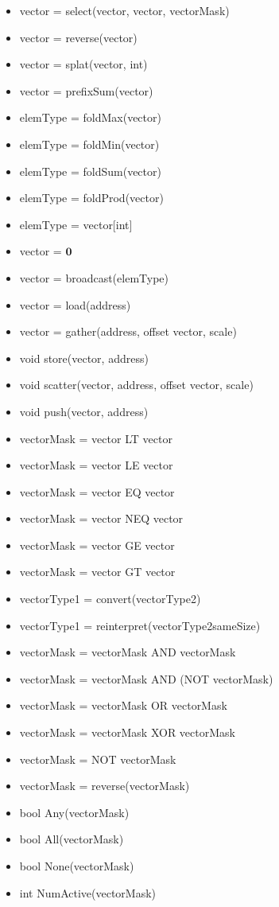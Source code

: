 \documentclass[11pt]{amsart}
\begin{document}
\begin{itemize}
\item vector = select(vector, vector, vectorMask)
\item vector = reverse(vector)
\item vector = splat(vector, int)
\item vector = prefixSum(vector)
\item elemType = foldMax(vector)
\item elemType = foldMin(vector)
\item elemType = foldSum(vector)
\item elemType = foldProd(vector)
\item elemType = vector[int]
\item vector = $\mathbf{0}$
\item vector = broadcast(elemType)
\item vector = load(address)
\item vector = gather(address, offset vector, scale)
\item void store(vector, address)
\item void scatter(vector, address, offset vector, scale)
\item void push(vector, address)
\item vectorMask = vector LT vector
\item vectorMask = vector LE vector
\item vectorMask = vector EQ vector
\item vectorMask = vector NEQ vector
\item vectorMask = vector GE vector
\item vectorMask = vector GT vector
\item vectorType1 = convert(vectorType2)
\item vectorType1 = reinterpret(vectorType2sameSize)
\item vectorMask = vectorMask AND vectorMask
\item vectorMask = vectorMask AND (NOT vectorMask)
\item vectorMask = vectorMask OR vectorMask
\item vectorMask = vectorMask XOR vectorMask
\item vectorMask = NOT vectorMask
\item vectorMask = reverse(vectorMask)
\item bool Any(vectorMask)
\item bool All(vectorMask)
\item bool None(vectorMask)

\item int NumActive(vectorMask)
\end{itemize}
\end{document}
